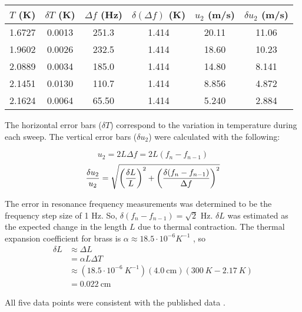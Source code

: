\documentclass[prb,aps,twocolumn,showpacs,10pt]{revtex4-1}
\begin{document}
\begin{center}
\begin{tabular}{|c|c|c|c|c|c|}
\hline
$T$ (K) & $\delta T$ (K) & $\Delta f$ (Hz) & $\delta(\Delta f)$ (K) & $u_2$ (m/s) & $\delta u_2$ (m/s)\\
\hline
\hline
1.6727&0.0013&251.3&1.414&20.11&11.06\\
\hline
1.9602&0.0026&232.5&1.414&18.60&10.23\\
\hline
2.0889&0.0034&185.0&1.414&14.80&8.141\\
\hline
2.1451&0.0130&110.7&1.414&8.856&4.872\\
\hline
2.1624&0.0064&65.50&1.414&5.240&2.884\\
\hline
\end{tabular}
\end{center}

The horizontal error bars ($\delta T$) correspond to the variation in temperature during each sweep. The vertical error bars ($\delta u_2$) were calculated with the following:

\begin{equation}
u_2 = 2 L \Delta f = 2 L (f_n-f_{n-1})
\end{equation}
\begin{equation}
\frac{\delta u_2}{u_2} = \sqrt{\left( \frac{\delta L }{L} \right)^2 + \left( \frac{\delta (f_n-f_{n-1}) }{\Delta f} \right)^2}\\ \\
\end{equation}


The error in resonance frequency measurements was determined to be the frequency step size of 1 Hz. So, $\delta (f_n-f_{n-1}) = \sqrt{2}$ Hz. $\delta L$ was estimated as the expected change in the length $L$ due to thermal contraction. The thermal expansion coefficient for brass \cite{toolbox} is $\alpha \approx 18.5 \cdot 10^{-6} K^{-1}$ , so
\begin{equation}
\begin{aligned}
\delta L &\approx \Delta L \\
&= \alpha L \Delta T \\
&\approx(18.5 \cdot 10^{-6}\  K^{-1})(4.0 \ \text{cm})(300 \ K - 2.17 \ K) \\
&= 0.022 \  \text{cm}
\end{aligned}
\end{equation}

All five data points were consistent with the published data \cite{blah}.
\end{document}
